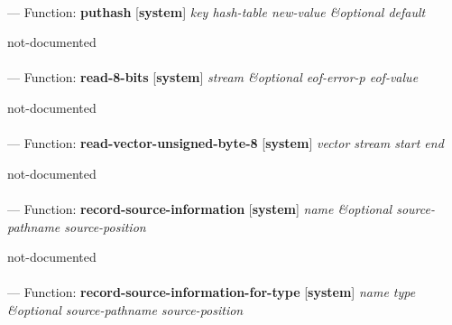 \paragraph{}
\label{SYSTEM:PUTHASH}
--- Function: \textbf{puthash} [\textbf{system}] \textit{key hash-table new-value \&optional default}

\begin{adjustwidth}{5em}{5em}
not-documented
\end{adjustwidth}

\paragraph{}
\label{SYSTEM:READ-8-BITS}
--- Function: \textbf{read-8-bits} [\textbf{system}] \textit{stream \&optional eof-error-p eof-value}

\begin{adjustwidth}{5em}{5em}
not-documented
\end{adjustwidth}

\paragraph{}
\label{SYSTEM:READ-VECTOR-UNSIGNED-BYTE-8}
--- Function: \textbf{read-vector-unsigned-byte-8} [\textbf{system}] \textit{vector stream start end}

\begin{adjustwidth}{5em}{5em}
not-documented
\end{adjustwidth}

\paragraph{}
\label{SYSTEM:RECORD-SOURCE-INFORMATION}
--- Function: \textbf{record-source-information} [\textbf{system}] \textit{name \&optional source-pathname source-position}

\begin{adjustwidth}{5em}{5em}
not-documented
\end{adjustwidth}

\paragraph{}
\label{SYSTEM:RECORD-SOURCE-INFORMATION-FOR-TYPE}
--- Function: \textbf{record-source-information-for-type} [\textbf{system}] \textit{name type \&optional source-pathname source-position}

